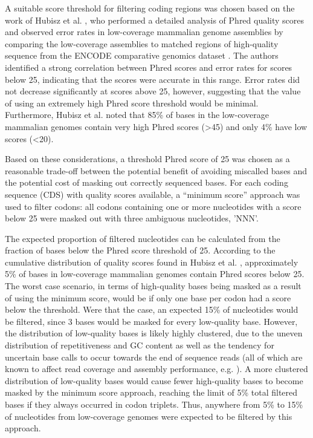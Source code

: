 A suitable score threshold for filtering coding regions was chosen
based on the work of Hubisz et al. \citeyearpar{TODO}, who performed a
detailed analysis of Phred quality scores and observed error rates in
low-coverage mammalian genome assemblies by comparing the low-coverage
assemblies to matched regions of high-quality sequence from the ENCODE
comparative genomics dataset \citep{TODO}. The authors identified a
strong correlation between Phred scores and error rates for scores
below 25, indicating that the scores were accurate in this
range. Error rates did not decrease significantly at scores above 25,
however, suggesting that the value of using an extremely high Phred
score threshold would be minimal. Furthermore, Hubisz et al. noted
that 85\% of bases in the low-coverage mammalian genomes contain very
high Phred scores (>45) and only 4\% have low scores (<20).

Based on these considerations, a threshold Phred score of 25 was
chosen as a reasonable trade-off between the potential benefit of
avoiding miscalled bases and the potential cost of masking out
correctly sequenced bases. For each coding sequence (CDS) with quality
scores available, a ``minimum score'' approach was used to filter
codons: all codons containing one or more nucleotides with a score
below 25 were masked out with three ambiguous nucleotides,
'NNN'.

The expected proportion of filtered nucleotides can be calculated from
the fraction of bases below the Phred score threshold of 25. According
to the cumulative distribution of quality scores found in Hubisz et
al. \citeyearpar{TODO}, approximately 5\% of bases in low-coverage
mammalian genomes contain Phred scores below 25. The worst case
scenario, in terms of high-quality bases being masked as a result of
using the minimum score, would be if only one base per codon had a
score below the threshold. Were that the case, an expected 15\% of
nucleotides would be filtered, since 3 bases would be masked for every
low-quality base. However, the distribution of low-quality bases is
likely highly clustered, due to the uneven distribution of
repetitiveness and GC content as well as the tendency for uncertain
base calls to occur towards the end of sequence reads (all of which
are known to affect read coverage and assembly performance,
e.g. \cite{TODO, Teytelman et al. 2011}). A more clustered
distribution of low-quality bases would cause fewer high-quality bases
to become masked by the minimum score approach, reaching the limit of
5\% total filtered bases if they always occurred in codon
triplets. Thus, anywhere from 5\% to 15\% of nucleotides from
low-coverage genomes were expected to be filtered by this approach.

